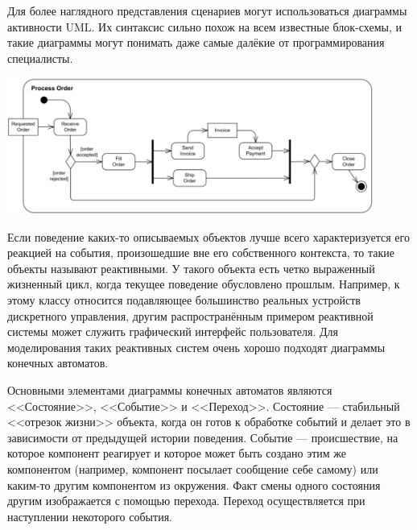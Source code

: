 \documentclass{../../text-style}
\begin{document}
Для более наглядного представления сценариев могут использоваться диаграммы активности UML. Их синтаксис сильно похож на всем известные блок-схемы, и такие диаграммы могут понимать даже самые далёкие от программирования специалисты.

\begin{center}
    \includegraphics[width=0.9\textwidth]{activity.png}
\end{center}

Если поведение каких-то описываемых объектов лучше всего характеризуется его реакцией на события, произошедшие вне его собственного контекста, то такие объекты называют реактивными. У такого объекта есть четко выраженный жизненный цикл, когда текущее поведение обусловлено прошлым. Например, к этому классу относится подавляющее большинство реальных устройств дискретного управления, другим распространённым примером реактивной системы может служить графический интерфейс пользователя. Для моделирования таких реактивных систем очень хорошо подходят диаграммы конечных автоматов. 

Основными элементами диаграммы конечных автоматов являются <<Состояние>>, <<Событие>> и <<Переход>>. Состояние --- стабильный <<отрезок жизни>> объекта, когда он готов к обработке событий и делает это в зависимости от предыдущей истории поведения. Событие --- происшествие, на которое компонент реагирует и которое может быть создано этим же компонентом (например, компонент посылает сообщение себе самому) или каким-то другим компонентом из окружения. Факт смены одного состояния другим изображается с помощью перехода. Переход осуществляется при наступлении некоторого события.
\end{document}
